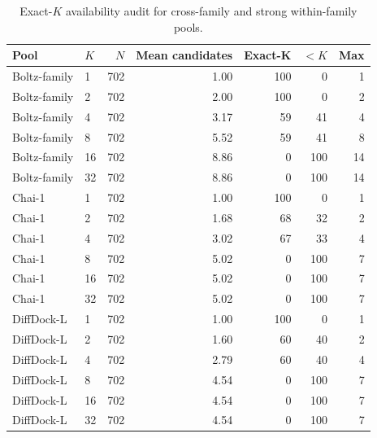 \begin{table}[!ht]
\centering
\caption{Exact-$K$ availability audit for cross-family and strong within-family pools.}
\label{tab:s_availability}
\small
\begin{tabular}{llrrrrr}
\toprule
Pool & $K$ & $N$ & Mean candidates & Exact-K & $<K$ & Max \\
\midrule
Boltz-family & 1 & 702 & 1.00 & 100 & 0 & 1 \\
Boltz-family & 2 & 702 & 2.00 & 100 & 0 & 2 \\
Boltz-family & 4 & 702 & 3.17 & 59 & 41 & 4 \\
Boltz-family & 8 & 702 & 5.52 & 59 & 41 & 8 \\
Boltz-family & 16 & 702 & 8.86 & 0 & 100 & 14 \\
Boltz-family & 32 & 702 & 8.86 & 0 & 100 & 14 \\
Chai-1 & 1 & 702 & 1.00 & 100 & 0 & 1 \\
Chai-1 & 2 & 702 & 1.68 & 68 & 32 & 2 \\
Chai-1 & 4 & 702 & 3.02 & 67 & 33 & 4 \\
Chai-1 & 8 & 702 & 5.02 & 0 & 100 & 7 \\
Chai-1 & 16 & 702 & 5.02 & 0 & 100 & 7 \\
Chai-1 & 32 & 702 & 5.02 & 0 & 100 & 7 \\
DiffDock-L & 1 & 702 & 1.00 & 100 & 0 & 1 \\
DiffDock-L & 2 & 702 & 1.60 & 60 & 40 & 2 \\
DiffDock-L & 4 & 702 & 2.79 & 60 & 40 & 4 \\
DiffDock-L & 8 & 702 & 4.54 & 0 & 100 & 7 \\
DiffDock-L & 16 & 702 & 4.54 & 0 & 100 & 7 \\
DiffDock-L & 32 & 702 & 4.54 & 0 & 100 & 7 \\
\bottomrule
\end{tabular}
\end{table}
